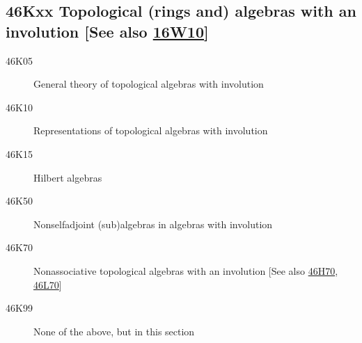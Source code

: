 \documentclass[letterpaper]{article}
\begin{document}
\subsection*{46Kxx  Topological (rings and) algebras with an involution [See also \hyperref[16W10]{16W10}] }\label{46Kxx}
\begin{description}  
\item [46K05]\label{46K05} General theory of topological algebras with involution
\item [46K10]\label{46K10} Representations of topological algebras with involution
\item [46K15]\label{46K15} Hilbert algebras
\item [46K50]\label{46K50} Nonselfadjoint (sub)algebras in algebras with involution
\item [46K70]\label{46K70} Nonassociative topological algebras with an involution [See also \hyperref[46H70]{46H70}, \hyperref[46L70]{46L70}]
\item [46K99]\label{46K99} None of the above, but in this section
\end{description}
\end{document}

